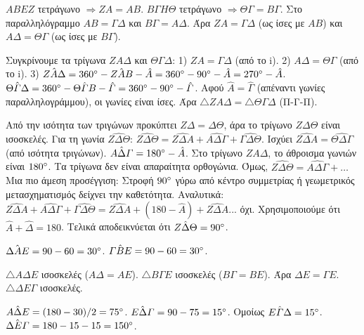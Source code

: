 \documentclass[11pt,a4paper,modern]{FFExercises}
\begin{document}
\begin{alist}
    \item $ABEZ$ τετράγωνο $\Rightarrow ZA=AB$. $B\varGamma H \Theta$ τετράγωνο $\Rightarrow \Theta\varGamma = B\varGamma$.
    Στο παραλληλόγραμμο $AB= \varGamma\Delta$ και $B\varGamma=A\Delta$.
    Άρα $ZA = \varGamma\Delta$ (ως ίσες με $AB$) και $A\Delta = \Theta\varGamma$ (ως ίσες με $B\varGamma$).
    \item Συγκρίνουμε τα τρίγωνα $ZA\Delta$ και $\Theta\varGamma\Delta$:
    1) $ZA = \varGamma\Delta$ (από το i).
    2) $A\Delta = \Theta\varGamma$ (από το i).
    3) $\hat{ZA\Delta} = 360\degree - \hat{ZAB} - \hat{A} = 360\degree - 90\degree - \hat{A} = 270\degree - \hat{A}$.
    $\hat{\Theta\varGamma\Delta} = 360\degree - \hat{\Theta\varGamma B} - \hat{\varGamma} = 360\degree - 90\degree - \hat{\varGamma}$.
    Αφού $\hat{A} = \hat{\varGamma}$ (απέναντι γωνίες παραλληλογράμμου), οι γωνίες είναι ίσες.
    Άρα $\triangle ZA\Delta = \triangle \Theta\varGamma\Delta$ (Π-Γ-Π).
    \item Από την ισότητα των τριγώνων προκύπτει $Z\Delta = \Delta\Theta$, άρα το τρίγωνο $Z\Delta\Theta$ είναι ισοσκελές.
    Για τη γωνία $\hat{Z\Delta\Theta}$:
    $\hat{Z\Delta\Theta} = \hat{Z\Delta A} + \hat{A\Delta\varGamma} + \hat{\varGamma\Delta\Theta}$.
    Ισχύει $\hat{Z\Delta A} = \hat{\Theta\Delta\varGamma}$ (από ισότητα τριγώνων).
    $\hat{A\Delta\varGamma} = 180\degree - \hat{A}$.
    Στο τρίγωνο $ZA\Delta$, το άθροισμα γωνιών είναι $180\degree$. Τα τρίγωνα δεν είναι απαραίτητα ορθογώνια.
    Όμως, $\hat{Z\Delta\Theta} = \hat{A\Delta\varGamma} + \dots$
    Μια πιο άμεση προσέγγιση: Στροφή $90\degree$ γύρω από κέντρο συμμετρίας ή γεωμετρικός μετασχηματισμός δείχνει την καθετότητα.
    Αναλυτικά: $\hat{Z\Delta A} + \hat{A\Delta \varGamma} + \hat{\varGamma\Delta \Theta} = \hat{Z\Delta A} + (180 - \hat{A}) + \hat{Z\Delta A}$... όχι.
    Χρησιμοποιούμε ότι $\hat{A} + \hat{\Delta} = 180$.
    Τελικά αποδεικνύεται ότι $\hat{Z\Delta\Theta} = 90\degree$.
\end{alist}

\begin{alist}
    \item $\hat{\Delta AE} = 90 - 60 = 30\degree$. $\hat{\varGamma BE} = 90 - 60 = 30\degree$.
    \item $\triangle A\Delta E$ ισοσκελές ($A\Delta=AE$). $\triangle B\varGamma E$ ισοσκελές ($B\varGamma=BE$).
    Άρα $\Delta E = \varGamma E$. $\triangle \Delta E\varGamma$ ισοσκελές.
    \item $\hat{A\Delta E} = (180-30)/2 = 75\degree$. $\hat{E\Delta\varGamma} = 90 - 75 = 15\degree$.
    Ομοίως $\hat{E\varGamma\Delta} = 15\degree$.
    $\hat{\Delta E\varGamma} = 180 - 15 - 15 = 150\degree$.
\end{alist}
\end{document}
